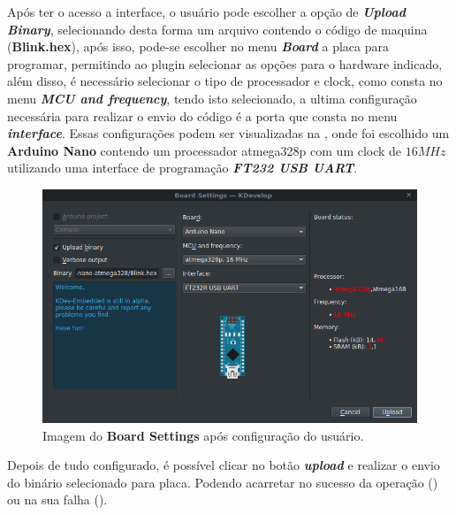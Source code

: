 Após ter o acesso a interface, o usuário pode escolher a opção de \textbf{\textit{Upload Binary}}, selecionando desta forma um arquivo contendo o código de maquina (\textbf{Blink.hex}), após isso, pode-se escolher no menu \textbf{\textit{Board}} a placa para programar, permitindo ao plugin selecionar as opções para o hardware indicado, além disso, é necessário selecionar o tipo de processador e clock, como consta no menu \textbf{\textit{MCU and frequency}}, tendo isto selecionado, a ultima configuração necessária para realizar o envio do código é a porta que consta no menu \textbf{\textit{interface}}. Essas configurações podem ser visualizadas na , onde foi escolhido um \textbf{Arduino Nano} contendo um processador atmega328p com um clock de $16MHz$ utilizando uma interface de programação \textbf{\textit{FT232 USB UART}}.

\begin{figure}[!htb]
  \centering
  \caption[Board Settings após configuração para envio]{Imagem do \textbf{Board Settings} após configuração do usuário.}
  \label{fig:boardsettingsserial}
  \includegraphics[width=1\textwidth]{figuras/boardsettingsSerial.png}
\end{figure}

Depois de tudo configurado, é possível clicar no botão \textbf{\textit{upload}} e realizar o envio do binário selecionado para placa. Podendo acarretar no sucesso da operação () ou na sua falha ().

